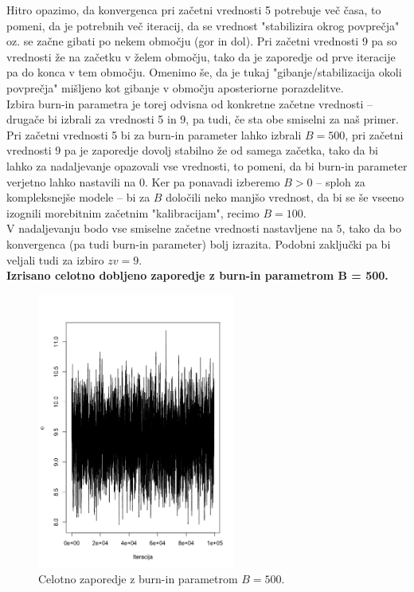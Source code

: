 \documentclass[a4paper,11pt]{article}
\begin{document}
\noindent
Hitro opazimo, da konvergenca pri začetni vrednosti 5 potrebuje več časa, to pomeni, da je potrebnih več iteracij, da se vrednost "stabilizira okrog povprečja" oz. se začne gibati po nekem območju (gor in dol).
Pri začetni vrednosti 9 pa so vrednosti že na začetku v želem območju, tako da je zaporedje od prve iteracije pa do konca v tem območju.
Omenimo še, da je tukaj "gibanje/stabilizacija okoli povprečja" mišljeno kot gibanje v območju aposteriorne porazdelitve.
\\
Izbira burn-in parametra je torej odvisna od konkretne začetne vrednosti -- drugače bi izbrali za vrednosti 5 in 9, pa tudi, če sta obe smiselni za naš primer.
\\ 
Pri začetni vrednosti 5 bi za burn-in parameter lahko izbrali $B = 500$, pri začetni vrednosti 9 pa je zaporedje dovolj stabilno že od samega začetka, tako da bi lahko za nadaljevanje opazovali vse vrednosti, to pomeni, da bi burn-in parameter verjetno lahko nastavili na 0. 
Ker pa ponavadi izberemo $B > 0$ -- sploh za kompleksnejše modele -- bi za $B$ določili neko manjšo vrednost, da bi se še vseeno izognili morebitnim začetnim "kalibracijam", recimo $B = 100$.
\\
V nadaljevanju bodo vse smiselne začetne vrednosti nastavljene na $5$, tako da bo konvergenca (pa tudi burn-in parameter) bolj izrazita. Podobni zaključki pa bi veljali tudi za izbiro $zv = 9$.
\\

\newpage
\noindent
\textbf{Izrisano celotno dobljeno zaporedje z burn-in parametrom B = 500.}
    \begin{figure}[ht!]
        \centering
        \includegraphics[width = 65mm]{Slike/2_3.png}
        \caption{Celotno zaporedje z burn-in parametrom $B = 500$.}
    \end{figure}
\end{document}
